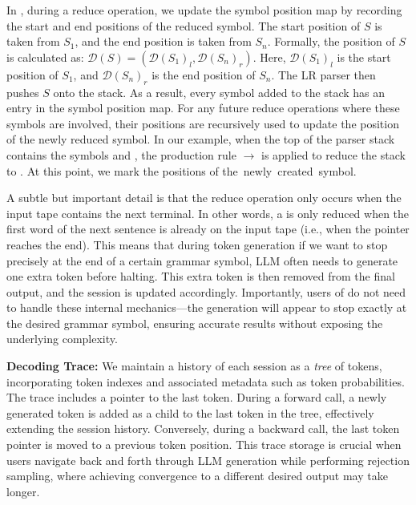 In \Tool{}, during a reduce operation, we update the symbol position map by recording the start and end positions of the reduced symbol. 
The start position of $S$ is taken from $S_1$, and the end position is taken from $S_n$.
Formally, the position of $S$ is calculated as: $\mathcal{D}(S) = (\mathcal{D}(S_1)_l, \mathcal{D}(S_n)_r)$.
Here, $\mathcal{D}(S_1)_l$ is the start position of $S_1$, and $\mathcal{D}(S_n)_r$ is the end position of $S_n$.
The LR parser then pushes $S$ onto the stack. 
As a result, every symbol added to the stack has an entry in the symbol position map. 
For any future reduce operations where these symbols are involved, their positions are recursively used to update the position of the newly reduced symbol.
In our example, when the top of the parser stack contains the symbols  and , the production rule  $\to$   is applied to reduce the stack to . 
At this point, we mark the positions of \mbox{the newly created  symbol.}

A subtle but important detail is that the reduce operation only occurs when the input tape contains the next terminal. 
In other words, a  is only reduced when the first word of the next sentence is already on the input tape (i.e., when the pointer reaches the end). This means that during token generation if we want \Tool{} to stop precisely at the end of a certain grammar symbol, LLM often needs to generate one extra token before halting. 
This extra token is then removed from the final output, and the \Tool{} session is updated accordingly.
Importantly, users of \Tool{} do not need to handle these internal mechanics—the generation will appear to stop exactly at the desired grammar symbol, ensuring accurate results without exposing the underlying complexity.




\noindent\textbf{Decoding Trace:}
We maintain a history of each session as a \emph{tree} of tokens, incorporating token indexes and associated metadata such as token probabilities. 
The trace includes a pointer to the last token.
During a forward call, a newly generated token is added as a child to the last token in the tree, effectively extending the session history. 
Conversely, during a backward call, the last token pointer is moved to a previous token position.
This trace storage is crucial when users navigate back and forth through LLM generation while performing rejection sampling, where achieving convergence to a different desired output may take longer. 

